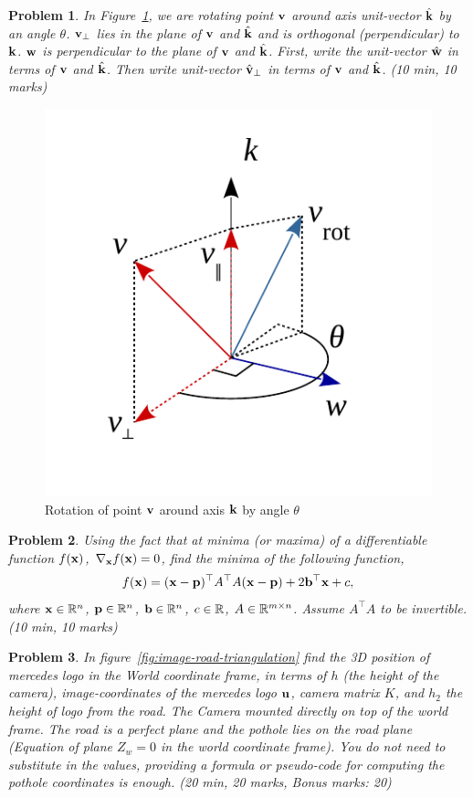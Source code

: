 \documentclass{article}
\newtheorem{prob}{Problem}
\begin{document}
\newpage

\begin{prob}
  In Figure~\ref{fig:Rodrigues-formula}, we are rotating point $\mathbf{v}$ around
  axis unit-vector $\hat{\mathbf{k}}$ by an angle $\theta$. $\mathbf{v}_{\perp}$ lies in the plane of $\mathbf{v}$
  and $\hat{\mathbf{k}}$ and is orthogonal (perpendicular) to $\mathbf{k}$. $\mathbf{w}$ is
  perpendicular to the plane of $\mathbf{v}$ and $\hat{\mathbf{k}}$. First, write the
  unit-vector $\hat{\mathbf{w}}$ in terms of $\mathbf{v}$ and $\hat{\mathbf{k}}$.
  Then write unit-vector $\hat{\mathbf{v}}_\perp$ in terms of $\mathbf{v}$ and $\hat{\mathbf{k}}$.
  (10 min, 10 marks)
\end{prob}
\begin{figure}
  \centering
  \includegraphics[width=0.5\linewidth]{media/Rodrigues-formula.pdf}
  \caption{Rotation of point $\mathbf{v}$ around axis $\mathbf{k}$ by angle $\theta$}
  \label{fig:Rodrigues-formula}
\end{figure}

\newpage
\begin{prob}
  Using the fact that at minima (or maxima) of a differentiable function
  $f(\mathbf{x})$, $\nabla_{\mathbf{x}} f(\mathbf{x}) = 0$, find the minima of the following
  function,
  \begin{align}
    f(\mathbf{x}) = (\mathbf{x} - \mathbf{p})^\top A^\top A (\mathbf{x}-\mathbf{p}) + 2 \mathbf{b}^\top \mathbf{x} + c,
  \end{align}
  where $\mathbf{x} \in \mathbb{R}^n$, $\mathbf{p} \in \mathbb{R}^n$, $\mathbf{b} \in \mathbb{R}^n$, $c \in \mathbb{R}$,
  $A \in \mathbb{R}^{m \times n}$. Assume $A^\top A$ to be invertible.
  (10 min, 10 marks)
\end{prob}

\newpage

\begin{prob}
  In figure~\ref{fig:image-road-triangulation} find the 3D position of mercedes logo
  in the World coordinate frame, in terms of $h$ (the height of the camera),
  image-coordinates of the mercedes logo $\mathbf{u}$, camera matrix $K$, and $h_2$
  the height of logo from the road. The Camera mounted directly on top of the
world frame. The road is a perfect plane and the pothole lies on the road plane
(Equation of plane $Z_w = 0$ in the world coordinate frame). You do not need to
substitute in the values, providing a formula or pseudo-code for computing the
pothole coordinates is enough. (20 min, 20 marks, Bonus marks: 20)
\end{prob}
\end{document}

